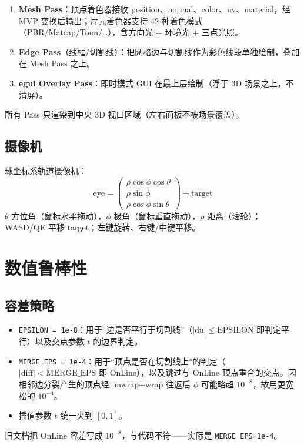 \documentclass[12pt,a4paper]{article}
\begin{document}
\begin{enumerate}
\item \textbf{Mesh Pass}：顶点着色器接收 position、normal、color、uv、material，经 MVP 变换后输出；片元着色器支持 42 种着色模式（PBR/Matcap/Toon/…），含方向光 + 环境光 + 三点光照。
\item \textbf{Edge Pass}（线框/切割线）：把网格边与切割线作为彩色线段单独绘制，叠加在 Mesh Pass 之上。
\item \textbf{egui Overlay Pass}：即时模式 GUI 在最上层绘制（浮于 3D 场景之上，不清屏）。
\end{enumerate}
所有 Pass 只渲染到中央 3D 视口区域（左右面板不被场景覆盖）。

\subsection{摄像机}

球坐标系轨道摄像机：
\begin{equation}
\text{eye} = \begin{pmatrix} \rho\cos\phi\cos\theta \\ \rho\sin\phi \\ \rho\cos\phi\sin\theta \end{pmatrix} + \text{target}
\end{equation}
$\theta$ 方位角（鼠标水平拖动），$\phi$ 极角（鼠标垂直拖动），$\rho$ 距离（滚轮）；WASD/QE 平移 target；左键旋转、右键/中键平移。

\section{数值鲁棒性}

\subsection{容差策略}

\begin{itemize}
\item \texttt{EPSILON = 1e-8}：用于“边是否平行于切割线”（$|\mathrm{du}|\le\mathrm{EPSILON}$ 即判定平行）以及交点参数 $t$ 的边界判定。
\item \texttt{MERGE\_EPS = 1e-4}：用于“顶点是否在切割线上”的判定（$|\mathrm{diff}|<\mathrm{MERGE\_EPS}$ 即 OnLine），以及跳过与 OnLine 顶点重合的交点。因相邻边分裂产生的顶点经 unwrap+wrap 往返后 $\phi$ 可能略超 $10^{-8}$，故用更宽松的 $10^{-4}$。
\item 插值参数 $t$ 统一夹到 $[0,1]$。
\end{itemize}
旧文档把 OnLine 容差写成 $10^{-8}$，与代码不符——实际是 \texttt{MERGE\_EPS=1e-4}。
\end{document}

